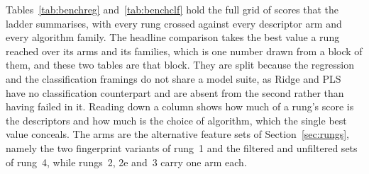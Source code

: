\begin{table}[htbp]
  \centering
  \footnotesize
  \caption{\textbf{Rung~3 descriptors.} The 22 MM/GBSA quantities, computed on the
    rung~2 pose after minimisation of the ligand hydrogens. Differences within a matched
    pair are what the models see, as the absolute values are not interpretable.}
  \label{tab:sirung3}
  
\end{table}

\begin{table}[htbp]
  \centering
  \footnotesize
  \caption{\textbf{Rung~4 descriptors and the reliability filter.} The 32 dynamic
    descriptors, the ratio of between-ligand to between-replicate spread for each, and
    the verdict that ratio produced.}
  \label{tab:sirung4}
  
\end{table}

Tables~\ref{tab:benchreg} and~\ref{tab:benchclf} hold the full grid of scores that the
ladder summarises, with every rung crossed against every descriptor arm and every
algorithm family. The headline comparison takes the best value a rung reached over its
arms and its families, which is one number drawn from a block of them, and these two
tables are that block. They are split because the regression and the classification
framings do not share a model suite, as Ridge and PLS have no classification counterpart
and are absent from the second rather than having failed in it. Reading down a column
shows how much of a rung's score is the descriptors and how much is the choice of
algorithm, which the single best value conceals. The arms are the alternative feature
sets of Section~\ref{sec:rungs}, namely the two fingerprint variants of rung~1 and the
filtered and unfiltered sets of rung~4, while rungs~2, 2e and~3 carry one arm each.

\begin{table}[tb]
  \centering
  \caption{\textbf{Every regression family on \framingA{} and \framingB{}.} Each rung
    with every descriptor arm it was scored with, so a quoted best value can be
    located in its grid.}
  \label{tab:benchreg}
  
\end{table}

\begin{table}[tb]
  \centering
  \caption{\textbf{Every classification family on \framingC{}.} The families differ from Table~\ref{tab:benchreg} because \framingC{} is a
    classification; Ridge and PLS have no counterpart here and are absent rather
    than failed.}
  \label{tab:benchclf}
  
\end{table}
